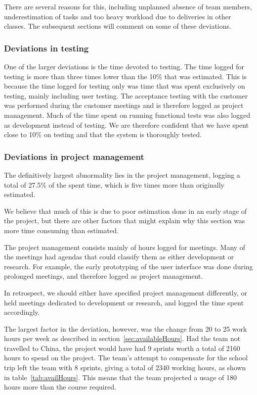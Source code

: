 There are several reasons for this, including unplanned absence of team members, underestimation of tasks and too heavy workload due to deliveries in other classes. The subsequent sections will comment on some of these deviations.

\subsubsection{Deviations in testing}
One of the larger deviations is the time devoted to testing. The time logged for testing is more than three times lower than the 10\% that was estimated. This is because the time logged for testing only was time that was spent exclusively on testing, mainly including user testing. The acceptance testing with the customer was performed during the customer meetings and is therefore logged as project management. Much of the time spent on running functional tests was also logged as development instead of testing. We are therefore confident that we have spent close to 10\% on testing and that the system is thoroughly tested.

\subsubsection{Deviations in project management}
The definitively largest abnormality lies in the project management, logging a total of 27.5\% of the spent time, which is five times more than originally estimated. 

We believe that much of this is due to poor estimation done in an early stage of the project, but there are other factors that might explain why this section was more time consuming than estimated.

The project management consists mainly of hours logged for meetings. Many of the meetings had agendas that could classify them as either development or research. For example, the early prototyping of the user interface was done during prolonged meetings, and therefore logged as project management. 

In retrospect, we should either have specified project management differently, or held meetings dedicated to development or research, and logged the time spent accordingly.

The largest factor in the deviation, however, was the change from 20 to 25 work hours per week as described in section~\ref{sec:availableHours}. Had the team not travelled to China, the project would have had 9 sprints worth a total of 2160 hours to spend on the project. The team's attempt to compensate for the school trip left the team with 8 sprints, giving a total of 2340 working hours, as shown in table~\ref{tab:availHours}. This means that the team projected a usage of 180 hours more than the course required.

